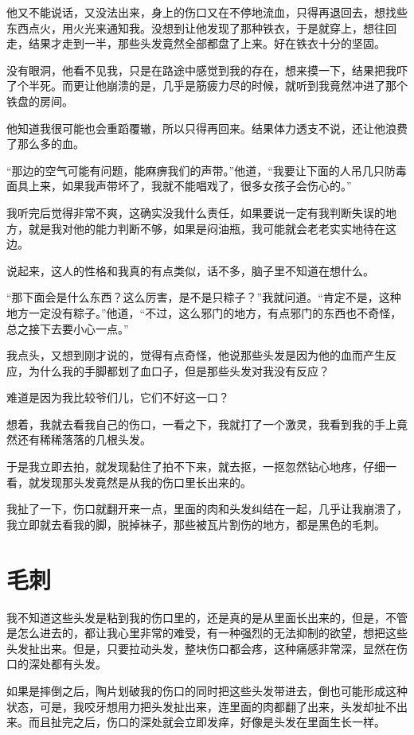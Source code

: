 他又不能说话，又没法出来，身上的伤口又在不停地流血，只得再退回去，想找些东西点火，用火光来通知我。没想到让他发现了那种铁衣，于是就穿上，想往回走，结果才走到一半，那些头发竟然全部都盘了上来。好在铁衣十分的坚固。

没有眼洞，他看不见我，只是在路途中感觉到我的存在，想来摸一下，结果把我吓了个半死。而更让他崩溃的是，几乎是筋疲力尽的时候，就听到我竟然冲进了那个铁盘的房间。

他知道我很可能也会重蹈覆辙，所以只得再回来。结果体力透支不说，还让他浪费了那么多的血。

“那边的空气可能有问题，能麻痹我们的声带。”他道，“我要让下面的人吊几只防毒面具上来，如果我声带坏了，我就不能唱戏了，很多女孩子会伤心的。”

我听完后觉得非常不爽，这确实没我什么责任，如果要说一定有我判断失误的地方，就是我对他的能力判断不够，如果是闷油瓶，我可能就会老老实实地待在这边。

说起来，这人的性格和我真的有点类似，话不多，脑子里不知道在想什么。

“那下面会是什么东西？这么厉害，是不是只粽子？”我就问道。“肯定不是，这种地方一定没有粽子。”他道，“不过，这么邪门的地方，有点邪门的东西也不奇怪，总之接下去要小心一点。”

我点头，又想到刚才说的，觉得有点奇怪，他说那些头发是因为他的血而产生反应，为什么我的手脚都划了血口子，但是那些头发对我没有反应？

难道是因为我比较爷们儿，它们不好这一口？

想着，我就去看我自己的伤口，一看之下，我就打了一个激灵，我看到我的手上竟然还有稀稀落落的几根头发。

于是我立即去拍，就发现黏住了拍不下来，就去抠，一抠忽然钻心地疼，仔细一看，就发现那头发竟然是从我的伤口里长出来的。

我扯了一下，伤口就翻开来一点，里面的肉和头发纠结在一起，几乎让我崩溃了，我立即就去看我的脚，脱掉袜子，那些被瓦片割伤的地方，都是黑色的毛刺。

\chapter{毛刺}

我不知道这些头发是粘到我的伤口里的，还是真的是从里面长出来的，但是，不管是怎么进去的，都让我心里非常的难受，有一种强烈的无法抑制的欲望，想把这些头发扯出来。但是，只要拉动头发，整块伤口都会疼，这种痛感非常深，显然在伤口的深处都有头发。

如果是摔倒之后，陶片划破我的伤口的同时把这些头发带进去，倒也可能形成这种状态，可是，我咬牙想用力把头发扯出来，连里面的肉都翻了出来，头发却扯不出来。而且扯完之后，伤口的深处就会立即发痒，好像是头发在里面生长一样。

